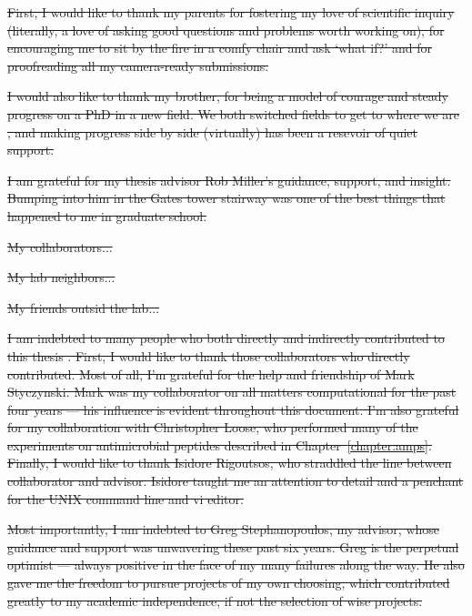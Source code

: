 \documentclass[12pt,twoside]{mitthesis}
\providecommand{\DIFdeltex}[1]{{\protect\color{red}\sout{#1}}}                      %
\providecommand{\DIFdel}[1]{\texorpdfstring{\DIFdeltex{#1}}{}} %
\begin{document}

\DIFdel{First, I would like to thank my parents for fostering my love of scientific inquiry (literally, a love of asking good questions and problems worth working on), for encouraging me to sit by the fire in a comfy chair and ask `what if?' and for proofreading all my camera-ready submissions. }%

\DIFdel{I would also like to thank my brother, for being a model of courage and steady progress on a PhD in a new field. We both switched fields to get to where we are , and making progress side by side (virtually) has been a resevoir of quiet support. }%

\DIFdel{I am grateful for my thesis advisor Rob Miller's guidance, support, and insight. Bumping into him in the Gates tower stairway was one of the best things that happened to me in graduate school. 
}%

\DIFdel{My collaborators...
}%

\DIFdel{My lab neighbors...
}%

\DIFdel{My friends outsid the lab...
}%

\DIFdel{I am indebted to many people who both directly and indirectly
contributed to this thesis .  First, I would like to thank those
collaborators who directly contributed.  Most of all, I'm grateful
for the help and friendship of Mark Styczynski. Mark was my
collaborator on all matters computational for the past four years
--- his influence is evident throughout this document.  I'm also
grateful for my collaboration with Christopher Loose, who performed
many of the experiments on antimicrobial peptides described in
Chapter~\ref{chapter:amps}.  Finally, I would like to thank Isidore Rigoutsos, who
straddled the line between collaborator and advisor.  Isidore taught
me an attention to detail and a penchant for the UNIX command line
and vi editor. }%

\DIFdel{Most importantly, I am indebted to Greg Stephanopoulos, my advisor,
whose guidance and support was unwavering these past six years.
Greg
is the perpetual optimist --- always positive in the face of my many
failures along the way.  He also gave me the freedom to pursue
projects of my own choosing, which contributed greatly to my
academic independence, if not the selection of wise projects. }%
\end{document}
